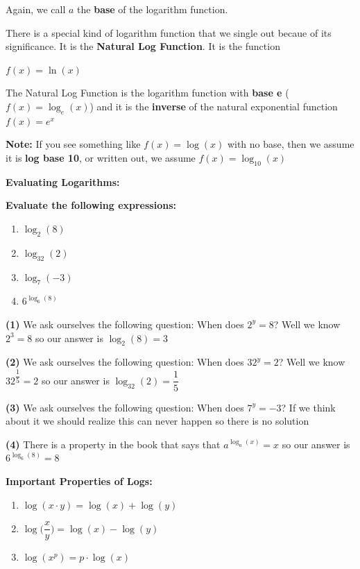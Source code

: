 \documentclass[12pt]{article}
\newenvironment{myindentpar}[1]%
     {\begin{list}{}%
             {\setlength{\leftmargin}{#1}}%
             \item[]%
     }
     {\end{list}}
\begin{document}
Again, we call $a$ the \textbf{base} of the logarithm function. 

There is a special kind of logarithm function that we single out becaue of its significance. It is the \textbf{Natural Log Function}. It is the function
\newline

\centerline{$f(x) = \ln(x)$}

The Natural Log Function is the logarithm function with \textbf{base e} ($f(x) = \log_{e}(x)$) and it is the \textbf{inverse} of the natural exponential function $f(x) = e^{x}$

\textbf{Note:} If you see something like $f(x) = \log(x)$ with no base, then we assume it is \textbf{log base 10}, or written out, we assume $f(x) = \log_{10}(x)$

\textbf{Evaluating Logarithms:}

\begin{myindentpar}{1cm}

\textbf{Evaluate the following expressions:}

\begin{enumerate}
\item $\log_{2}(8)$ 
\item $\log_{32}(2)$
\item $\log_{7}(-3)$
\item $6^{\log_{6}(8)}$

\end{enumerate}

\textbf{(1)} We ask ourselves the following question: When does $2^{y} = 8$? Well we know $2^{3} = 8$ so our answer is $\log_{2}(8) = 3$ 

\textbf{(2)} We ask ourselves the following question: When does $32^{y} = 2$? Well we know $32^{\dfrac{1}{5}} = 2$ so our answer is $\log_{32}(2) = \dfrac{1}{5}$ 

\textbf{(3)} We ask ourselves the following question: When does $7^{y} = -3$? If we think about it we should realize this can never happen so there is no solution

\textbf{(4)} There is a property in the book that says that $a^{\log_{a}(x)} = x$ so our answer is $6^{\log_{6}(8)} = 8$
\end{myindentpar}

\vspace{1cm}

\textbf{Important Properties of Logs:}
\begin{myindentpar}{2cm}
\begin{enumerate}
\item $\log(x \cdot y) = \log(x) + \log(y)$ 
\item $\log\Big(\dfrac{x}{y}\Big) = \log(x) - \log(y)$
\item $\log(x^{p}) = p \cdot \log(x)$
\end{enumerate}
\end{myindentpar}
\end{document}
